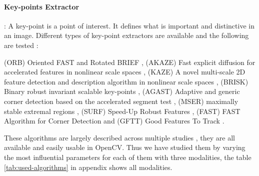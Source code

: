 \documentclass[a4paper,twoside]{article}
\begin{document}
	\paragraph{Key-points Extractor} :
	A key-point is a point of interest. It defines what is important and distinctive in an image.
	Different types of key-point extractors are available and the following are tested :
	\\
	\par (ORB) Oriented FAST and Rotated BRIEF \cite{Rublee:2011:OEA:2355573.2356268}, 
	(AKAZE) Fast explicit diffusion for accelerated features in nonlinear scale spaces \cite{alcantarilla2011fast}, 
	(KAZE) A novel multi-scale 2D feature detection and description algorithm in nonlinear scale spaces \cite{rs10050756}, 
	(BRISK) Binary robust invariant scalable key-points \cite{leutenegger2011brisk}, 
	(AGAST) Adaptive and generic corner detection based on the accelerated segment test \cite{mair2010adaptive}, 
	(MSER) maximally stable extremal regions \cite{donoser2006efficient}, 
	(SURF) Speed-Up Robust Features \cite{bay2006surf}, 
	(FAST) FAST Algorithm for Corner Detection \cite{trajkovic1998fast}
	and (GFTT) Good Features To Track \cite{shi1994good}.
	\\
	\par These algorithms are largely described across multiple studies \cite{DantasDiasJunior, Tareen2018ACA, Zhang2016EXTENSIONAE, ali2016comparison},
	they are all available and easily usable in OpenCV. Thus we have studied them by varying the most influential parameters for each of them with three modalities,
	the table \ref{tab:used-algorithms} in appendix shows all modalities.
	
	
	\begin{table}[h]
		\centering
		\caption{list of algorithms with 3 modalities of their parameters}
		\label{tab:used-algorithms}
	\end{table}
	
\end{document}
